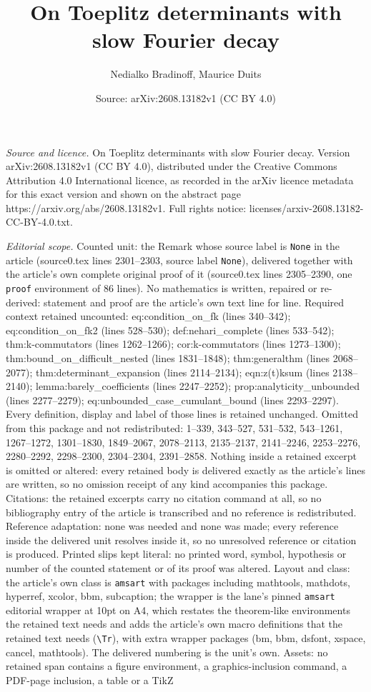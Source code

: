 \documentclass[10pt,a4paper]{amsart}
\title[On Toeplitz determinants with slow Fourier decay]{On Toeplitz determinants with slow Fourier decay}
\author{Nedialko Bradinoff, Maurice Duits}
\date{Source: arXiv:2608.13182v1 (CC BY 4.0)}
\begin{document}
\maketitle

\noindent\emph{Source and licence.} On Toeplitz determinants with slow Fourier decay. Version arXiv:2608.13182v1 (CC BY 4.0), distributed under the Creative Commons Attribution 4.0 International licence, as recorded in the arXiv licence metadata for this exact version and shown on the abstract page https://arxiv.org/abs/2608.13182v1. Full rights notice: licenses/arxiv-2608.13182-CC-BY-4.0.txt.\par\smallskip

\noindent\textit{Editorial scope.} Counted unit: the Remark whose source label is \texttt{None} in the article (source0.tex lines 2301--2303, source label \texttt{None}), delivered together with the article's own complete original proof of it (source0.tex lines 2305--2390, one \texttt{proof} environment of 86 lines). No mathematics is written, repaired or re-derived: statement and proof are the article's own text line for line. Required context retained uncounted: eq:condition\_on\_fk (lines 340--342); eq:condition\_on\_fk2 (lines 528--530); def:nehari\_complete (lines 533--542); thm:k-commutators (lines 1262--1266); cor:k-commutators (lines 1273--1300); thm:bound\_on\_difficult\_nested (lines 1831--1848); thm:generalthm (lines 2068--2077); thm:determinant\_expansion (lines 2114--2134); eqn:z(t)ksum (lines 2138--2140); lemma:barely\_coefficients (lines 2247--2252); prop:analyticity\_unbounded (lines 2277--2279); eq:unbounded\_case\_cumulant\_bound (lines 2293--2297). Every definition, display and label of those lines is retained unchanged. Omitted from this package and not redistributed: 1--339, 343--527, 531--532, 543--1261, 1267--1272, 1301--1830, 1849--2067, 2078--2113, 2135--2137, 2141--2246, 2253--2276, 2280--2292, 2298--2300, 2304--2304, 2391--2858. Nothing inside a retained excerpt is omitted or altered: every retained body is delivered exactly as the article's lines are written, so no omission receipt of any kind accompanies this package. Citations: the retained excerpts carry no citation command at all, so no bibliography entry of the article is transcribed and no reference is redistributed. Reference adaptation: none was needed and none was made; every reference inside the delivered unit resolves inside it, so no unresolved reference or citation is produced. Printed slips kept literal: no printed word, symbol, hypothesis or number of the counted statement or of its proof was altered. Layout and class: the article's own class is \texttt{amsart} with packages including mathtools, mathdots, hyperref, xcolor, bbm, subcaption; the wrapper is the lane's pinned \texttt{amsart} editorial wrapper at 10pt on A4, which restates the theorem-like environments the retained text needs and adds the article's own macro definitions that the retained text needs (\texttt{\textbackslash Tr}), with extra wrapper packages (bm, bbm, dsfont, xspace, cancel, mathtools). The delivered numbering is the unit's own. Assets: no retained span contains a figure environment, a graphics-inclusion command, a PDF-page inclusion, a table or a TikZ 
\end{document}
